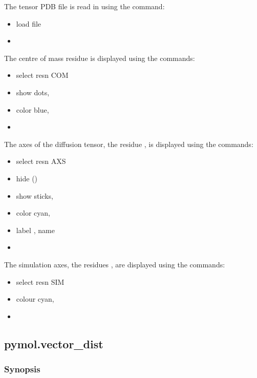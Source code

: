  The tensor PDB file is read in using the command: 
  

 \begin{itemize} 
 \item[] load file  
 \item[]  
 \end{itemize} 
  

 The centre of mass residue  is displayed using the commands: 
  

 \begin{itemize} 
 \item[] select resn COM  
 \item[] show dots,   
 \item[] color blue,   
 \item[]  
 \end{itemize} 
  

 The axes of the diffusion tensor, the residue , is displayed using the commands: 
  

 \begin{itemize} 
 \item[] select resn AXS  
 \item[] hide ()  
 \item[] show sticks,   
 \item[] color cyan,   
 \item[] label , name  
 \item[]  
 \end{itemize} 
  

 The simulation axes, the residues , are displayed using the commands: 
  

 \begin{itemize} 
 \item[] select resn SIM  
 \item[] colour cyan,   
 \item[]  
 \end{itemize} 
  

  

 \newpage 

 \subsection{pymol.vector\_dist} 

  
 \subsubsection{Synopsis} 

